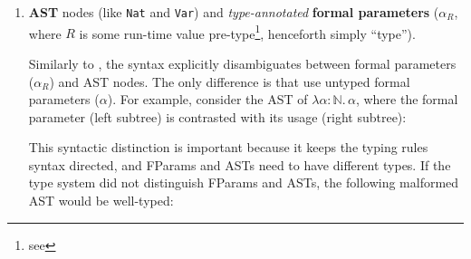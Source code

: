 \begin{enumerate}
\item \textbf{AST} nodes (like \texttt{Nat} and \texttt{Var}) and \textit{type-annotated} \textbf{formal parameters} ($\alpha_R$, where $R$ is some run-time value pre-type\footnote{see }, henceforth simply ``type'').

Similarly to \citet{calcagno-2003}, the syntax explicitly disambiguates between formal parameters ($\alpha_R$) and AST nodes. The only difference is that \citeauthor{calcagno-2003} use untyped formal parameters ($\alpha$). For example, consider the AST of $\lambda\alpha{}$${:}\mathbb{N}. \,\alpha$, where the formal parameter (left subtree) is contrasted with its usage (right subtree):

\begin{center}
\end{center}

This syntactic distinction is important because it keeps the typing rules syntax directed, and \textsf{FParam}s and \textsf{AST}s need to have different types. If the type system did not distinguish \textsf{FParam}s and \textsf{AST}s, the following malformed AST would be well-typed:
\begin{center}
\end{center}



\end{enumerate}
